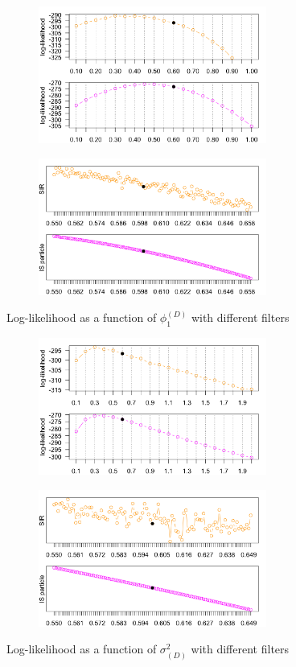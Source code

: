 \documentclass[11pt, oneside]{scrreprt}   	%
\begin{document}
\begin{figure}[h!]
\centering
\begin{subfigure}{.5\textwidth}
  \centering
  \includegraphics[width=75mm]{../../images/hdpm-loglik-Dphi1.png}
\end{subfigure}%
\begin{subfigure}{.5\textwidth}
  \centering
  \includegraphics[width=75mm]{../../images/hdpm-loglik-Dphi1-zoom.png}
\end{subfigure}
\caption{Log-likelihood as a function of $\phi_1^{(D)}$ with different filters}
\label{fig:hdpm_loglik_Dphi1}
\end{figure}

\begin{figure}[h!]
\centering
\begin{subfigure}{.5\textwidth}
  \centering
  \includegraphics[width=75mm]{../../images/hdpm-loglik-Dvar.png}
\end{subfigure}%
\begin{subfigure}{.5\textwidth}
  \centering
  \includegraphics[width=75mm]{../../images/hdpm-loglik-Dvar-zoom.png}
\end{subfigure}
\caption{Log-likelihood as a function of $\sigma_{(D)}^2$ with different filters}
\label{fig:hdpm_loglik_Dvar}
\end{figure}
\end{document}

